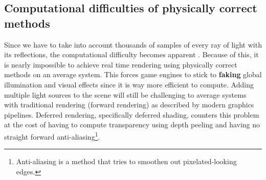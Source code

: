 \documentclass{ACGSeminar}
\begin{document}
	\subsection{Computational difficulties of physically correct methods}
	Since we have to take into account thousands of samples of every ray of light with its reflections, the computational difficulty becomes apparent \cite{DST}. Because of this, it is nearly impossible to achieve real time rendering using physically correct methods on an average system. This forces game engines to stick to \textbf{faking} global illumination and visual effects since it is way more efficient to compute. Adding multiple light sources to the scene will still be challenging to average systems with traditional rendering (forward rendering) as described by modern graphics pipelines. Deferred rendering, specifically deferred shading, counters this problem at the cost of having to compute transparency using depth peeling and having no straight forward anti-aliasing\footnote{Anti-aliasing is a method that tries to smoothen out pixelated-looking edges.}.
\end{document}
